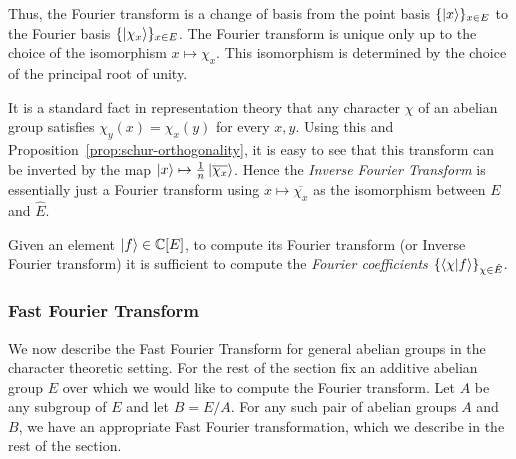 \documentclass[11pt]{article}
\begin{document}
Thus, the Fourier transform is a change of basis from the point basis
$\{ \left| x \right\rangle \}_{x \in E}$ to the Fourier basis $\{
\left| \chi_x \right\rangle\}_{x\in E}$. The Fourier transform is unique only up to
the choice of the isomorphism $x \mapsto \chi_x$. This isomorphism is
determined by the choice of the principal root of unity.

It is a standard fact in representation theory that any character
$\chi$ of an abelian group satisfies $\chi_y(x) = \chi_x(y)$ for every
$x,y$. Using this and Proposition~\ref{prop:schur-orthogonality}, it is easy
to see that this transform can be inverted by the map $\left| x \right\rangle \mapsto
\frac{1}{n}\left| \overline{\chi_x} \right\rangle$. Hence the \emph{Inverse Fourier
  Transform} is essentially just a Fourier transform using $x\mapsto
\overline{\chi_x}$ as the isomorphism between $E$ and $\hat{E}$.

\begin{remark}\label{rem-Fourier-inner}
  Given an element $\left| f \right\rangle \in
  \mathbb{C}[E]$, to compute its Fourier transform (or Inverse Fourier transform) it is sufficient to compute
  the \emph{Fourier coefficients} $\{\langle \chi|f \rangle \}_{\chi \in
    \hat{E}}$.
\end{remark}

\subsubsection*{Fast Fourier Transform}

We now describe the Fast Fourier Transform for general abelian groups
in the character theoretic setting. For the rest of the section fix an
additive abelian group $E$ over which we would like to compute the
Fourier transform. Let $A$ be any subgroup of $E$ and let $B =
E/A$. For any such pair of abelian groups $A$ and $B$, we have an
appropriate Fast Fourier transformation, which we describe in the rest
of the section.
\end{document}

